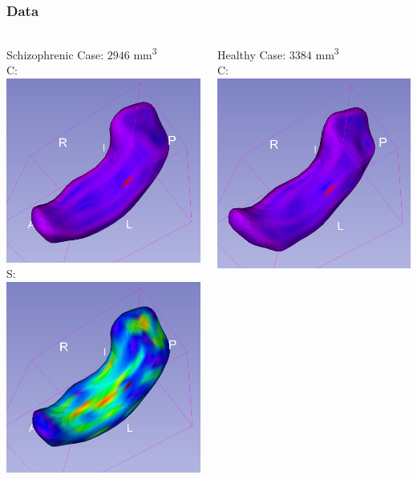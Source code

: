 \documentclass{beamer}
\begin{document}
\begin{frame}
\frametitle{Data}
\begin{columns}
\begin{column}{0.5\textwidth}
    \begin{center}
    Schizophrenic Case: $2946$ mm\textsuperscript{3}\\
    C: \includegraphics[width=0.5\linewidth]{YC.png}\\
    S: \includegraphics[width=0.5\linewidth]{YS.png}
    \end{center}
\end{column}
\begin{column}{0.5\textwidth} 
    \begin{center}
    Healthy Case: $3384$ mm\textsuperscript{3}\\
    C: \includegraphics[width=0.5\linewidth]{NC.png}\\

\end{center}
\end{column}
\end{columns}
\end{frame}
\end{document}
